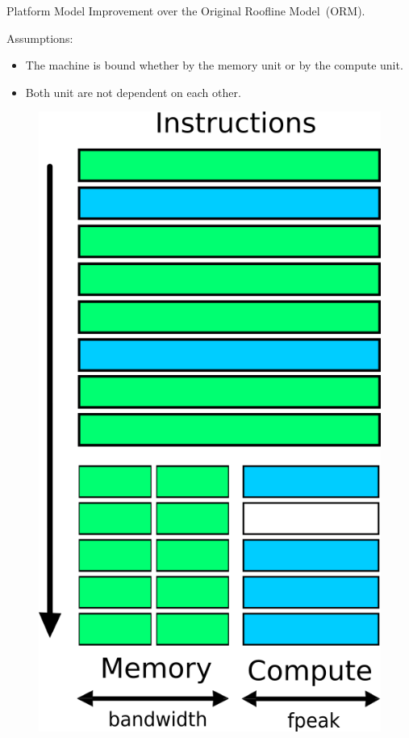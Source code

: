 
\begin{nframe}{Platform Model}
  Improvement over the Original Roofline Model~(ORM).

  \vspace{5mm}
  \begin{minipage}{.5\textwidth}
  Assumptions:

  \begin{itemize}
  \item The machine is bound whether by the memory unit or by the compute unit.
  \item Both unit are not dependent on each other.
  \end{itemize}
  \end{minipage}%
  \begin{minipage}{.5\textwidth}
  \begin{figure}
    \centering
    \includegraphics[width=\textwidth, height=.6\paperheight, keepaspectratio]{pictures/ORM_base.png}

\end{figure}
\end{minipage}
\end{nframe}

